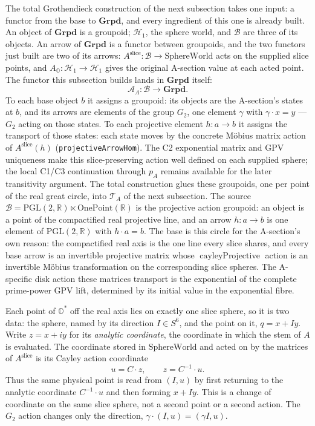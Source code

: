 \documentclass[11pt]{article}
\newcommand{\OO}{\mathbb{O}}
\newcommand{\RR}{\mathbb{R}}
\providecommand{\SphereWorld}{\mathrm{SphereWorld}}
\theoremstyle{plain}
\theoremstyle{definition}
\theoremstyle{remark}
\begin{document}
The total Grothendieck construction of the next subsection takes one
input: a functor from the base to $\mathbf{Grpd}$, and every ingredient of
this one is already built. An object of $\mathbf{Grpd}$ is a groupoid; $\mathcal H_1$, the sphere
world, and $\mathcal B$ are three of its objects. An arrow of
$\mathbf{Grpd}$ is a functor between groupoids, and the two functors just
built are two of its arrows: $A^{\mathrm{slice}}:\mathcal B\to\SphereWorld$
acts on the supplied slice points, and
$A_{\OO}:\mathcal H_1\to\mathcal H_1$ gives the original A-section value
at each acted point. The functor this subsection builds lands in
$\mathbf{Grpd}$ itself:
\[
  \mathcal A_A:\mathcal B\longrightarrow\mathbf{Grpd}.
\]
To each base object $b$ it assigns a groupoid: its objects are the
A-section's states at $b$, and its arrows are elements of the group $G_2$,
one element $\gamma$ with $\gamma\cdot x=y$ --- $G_2$ acting on those
states. To each projective element $h:a\to b$ it
assigns the transport of those states: each state moves by the concrete
M\"obius matrix action of $A^{\mathrm{slice}}(h)$
(\texttt{projectiveArrowHom}). The C2 exponential matrix and GPV uniqueness
make this slice-preserving action well defined on each supplied sphere;
the local C1/C3 continuation through $p_A$ remains available for the later
transitivity argument. The
total construction glues these groupoids, one per point of the real great
circle, into $\mathcal T_A$ of the next subsection. The source
$\mathcal B=\mathrm{PGL}(2,\RR)\ltimes\mathrm{OnePoint}(\RR)$ is the
projective action groupoid: an object is a point of the compactified real
projective line, and an arrow $h:a\to b$ is one element of
$\mathrm{PGL}(2,\RR)$ with $h\cdot a=b$. The base is this circle for the
A-section's own reason: the compactified real axis is the one line every
slice shares, and every base
arrow is an invertible projective matrix whose
$\operatorname{cayleyProjective}$ action is an invertible M\"obius
transformation on the corresponding slice spheres.  The A-specific disk
action these matrices transport is the exponential of the complete
prime-power GPV lift, determined by its initial value in the exponential
fibre.

Each point of $\OO^{*}$ off the real axis lies on exactly one slice sphere,
so it is two data: the sphere, named by its direction $I\in S^6$, and the
point on it, $q=x+Iy$.  Write $z=x+iy$ for its \emph{analytic coordinate},
the coordinate in which the stem of $A$ is evaluated.  The coordinate stored
in $\SphereWorld$ and acted on by the matrices of $A^{\mathrm{slice}}$ is its
Cayley action coordinate
\[
  u=C\mathbin{\cdot}z,\qquad z=C^{-1}\mathbin{\cdot}u.
\]
Thus the same physical point is read from $(I,u)$ by first returning to the
analytic coordinate $C^{-1}\cdot u$ and then forming $x+Iy$.  This is a
change of coordinate on the same slice sphere, not a second point or a second
action.  The $G_2$ action changes only the direction,
$\gamma\cdot(I,u)=(\gamma I,u)$.
\end{document}
